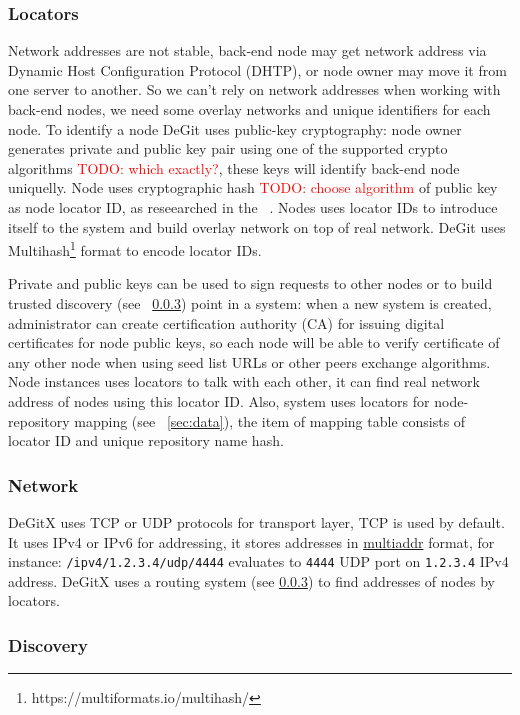 \documentclass[nonacm=true]{acmart}
\newcommand{\code}[1]{\texttt{#1}}
\newcommand{\todo}[1]{\textcolor{red}{TODO: #1}}
\begin{document}
\subsubsection{Locators}
\label{sec:locators}
Network addresses are not stable, back-end node may get network address via
Dynamic Host Configuration Protocol (DHTP), or node owner may move it from one server to another.
So we can't rely on network addresses when working with back-end nodes, we need some
overlay networks and unique identifiers for each node. To identify a node DeGit uses
public-key cryptography: node owner generates private and public key pair using one of the supported
crypto algorithms \todo{which exactly?}, these keys will identify back-end node uniquelly.
Node uses cryptographic hash \todo{choose algorithm} of public key as node locator ID,
as reseearched in the ~\cite{securebaserouting}. Nodes uses locator IDs to introduce
itself to the system and build overlay network on top of real network. DeGit uses
Multihash\footnote{https://multiformats.io/multihash/} format to encode locator IDs.

Private and public keys can be used to sign requests to other nodes or to build
trusted discovery (see ~\ref{sec:discovery}) point in a system: when a new system is created,
administrator can create certification authority (CA) for issuing digital certificates for node
public keys, so each node will be able to verify certificate of any other node when
using seed list URLs or other peers exchange algorithms. Node instances uses locators to talk
with each other, it can find real network address of nodes using this locator ID.
Also, system uses locators for node-repository mapping (see ~\ref{sec:data}),
the item of mapping table consists of locator ID and unique repository name hash.

\subsubsection{Network}
\label{sec:network}

DeGitX uses TCP or UDP protocols for transport layer, TCP is used by default. It uses IPv4 or IPv6 for addressing,
it stores addresses in \href{https://github.com/multiformats/multiaddr}{multiaddr} format, for instance:
\code{/ipv4/1.2.3.4/udp/4444} evaluates to \code{4444} UDP port on \code{1.2.3.4} IPv4 address.
DeGitX uses a routing system (see \ref{sec:discovery}) to find addresses of nodes by locators.

\subsubsection{Discovery}
\label{sec:discovery}
\end{document}
